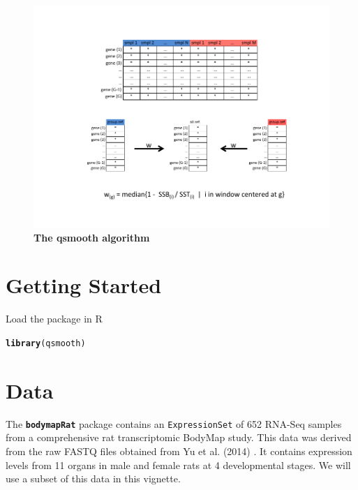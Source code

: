 \documentclass{article}\usepackage[]{graphicx}\usepackage[usenames,dvipsnames]{color}
\makeatletter
\newcommand{\hlstd}[1]{\textcolor[rgb]{0.345,0.345,0.345}{#1}}%
\newcommand{\hlkwd}[1]{\textcolor[rgb]{0.737,0.353,0.396}{\textbf{#1}}}%
\newenvironment{kframe}{%
 \def\at@end@of@kframe{}%
 \ifinner\ifhmode%
  \def\at@end@of@kframe{\end{minipage}}%
  \begin{minipage}{\columnwidth}%
 \fi\fi%
 \def\FrameCommand##1{\hskip\@totalleftmargin \hskip-\fboxsep
 \colorbox{shadecolor}{##1}\hskip-\fboxsep
     \hskip-\linewidth \hskip-\@totalleftmargin \hskip\columnwidth}%
 \MakeFramed {\advance\hsize-\width
   \@totalleftmargin\z@ \linewidth\hsize
   \@setminipage}}%
 {\par\unskip\endMakeFramed%
 \at@end@of@kframe}
\newenvironment{knitrout}{}{} %
\makeatother
\begin{document}
\begin{figure}[!h]
\begin{center}
\includegraphics[width=\columnwidth]{qsmooth_algo.pdf}
\end{center}
\small\normalsize
\caption[qsmooth algorithm]
         {{\bf The qsmooth algorithm}}
\label{algo}
\end{figure}


\section{Getting Started}

Load the package in R
\begin{knitrout}
\color{fgcolor}\begin{kframe}
\begin{alltt}
\hlkwd{library}\hlstd{(qsmooth)}
\end{alltt}
\end{kframe}
\end{knitrout}


\section{Data} 

The \texttt{\bf{bodymapRat}} package contains an 
\texttt{ExpressionSet} of 652 RNA-Seq samples from a comprehensive 
rat transcriptomic BodyMap study. This data was derived from
the raw FASTQ files obtained from Yu et al. (2014) \cite{Yu2014}. 
It contains expression levels from 11 organs in male and female
rats at 4 developmental stages. We will use a subset of this 
data in this vignette.
\end{document}
